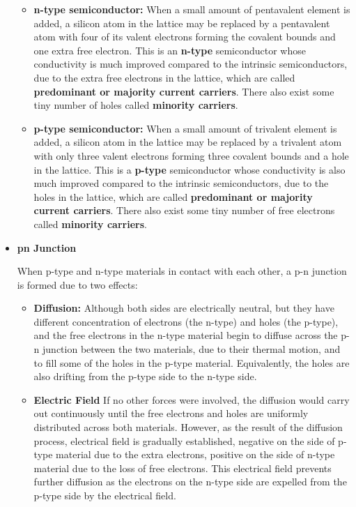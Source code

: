 \begin{itemize}
\begin{itemize}
\item {\bf n-type semiconductor:}
When a small amount of pentavalent element is added, a silicon atom in the
lattice may be replaced by a pentavalent atom with four of its valent electrons
forming the covalent bounds and one extra free electron. This is an {\bf n-type}
semiconductor whose conductivity is much improved compared to the intrinsic
semiconductors, due to the extra free electrons in the lattice, which are called
{\bf predominant or majority current carriers}. There also exist some tiny number 
of holes called {\bf minority carriers}.

\item {\bf p-type semiconductor:}
When a small amount of trivalent element is added, a silicon atom in the
lattice may be replaced by a trivalent atom with only three valent electrons
forming three covalent bounds and a hole in the lattice. This is a {\bf p-type}
semiconductor whose conductivity is also much improved compared to the intrinsic
semiconductors, due to the holes in the lattice, which are called {\bf predominant 
or majority current carriers}. There also exist some tiny number of free electrons
called {\bf minority carriers}.
\end{itemize}


\item {\bf pn Junction}


When p-type and n-type materials in contact with each other, a p-n junction is
formed due to two effects:
\begin{itemize}
\item {\bf Diffusion:}
Although both sides are electrically neutral, but they have different
concentration of electrons (the n-type) and holes (the p-type), and the 
free electrons in the n-type material begin to diffuse across the p-n junction
between the two materials, due to their thermal motion, and to fill some of the
holes in the p-type material. Equivalently, the holes are also drifting from
the p-type side to the n-type side.

\item {\bf Electric Field}
If no other forces were involved, the diffusion would carry out 
continuously until the free electrons and holes are uniformly distributed
across both materials. However, as the result of the diffusion process,
electrical field is gradually established, negative on the side of p-type 
material due to the extra electrons, positive on the side of n-type 
material due to the loss of free electrons. This electrical field prevents
further diffusion as the electrons on the n-type side are expelled from
the p-type side by the electrical field.


\end{itemize}
\end{itemize}
